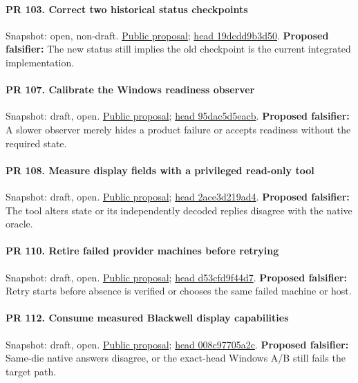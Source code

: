\paragraph{PR 103. Correct two historical status checkpoints}
\readcode Snapshot: open, non-draft.
\href{\repobase/pull/103}{Public proposal};
\href{\repobase/commit/19dcdd9b3d50d6453a933921f96f60667002d7f3}{head 19dcdd9b3d50}.
\textbf{Proposed falsifier:} The new status still implies the old checkpoint is the current
  integrated implementation.

\paragraph{PR 107. Calibrate the Windows readiness observer}
\readcode Snapshot: draft, open.
\href{\repobase/pull/107}{Public proposal};
\href{\repobase/commit/95dac5d5eacb3d2f7b9b8763c4f9df556056599f}{head 95dac5d5eacb}.
\textbf{Proposed falsifier:} A slower observer merely hides a product failure or accepts readiness
  without the required state.

\paragraph{PR 108. Measure display fields with a privileged read-only tool}
\readcode Snapshot: draft, open.
\href{\repobase/pull/108}{Public proposal};
\href{\repobase/commit/2ace3d219ad4490af41c5eccff5b48ea7009a228}{head 2ace3d219ad4}.
\textbf{Proposed falsifier:} The tool alters state or its independently decoded replies disagree
  with the native oracle.

\paragraph{PR 110. Retire failed provider machines before retrying}
\readcode Snapshot: draft, open.
\href{\repobase/pull/110}{Public proposal};
\href{\repobase/commit/d53cfd9f44d7bdbc87887c2e19fb3431545d84b5}{head d53cfd9f44d7}.
\textbf{Proposed falsifier:} Retry starts before absence is verified or chooses the same failed
  machine or host.

\paragraph{PR 112. Consume measured Blackwell display capabilities}
\readcode Snapshot: draft, open.
\href{\repobase/pull/112}{Public proposal};
\href{\repobase/commit/008c97705a2c1cd043f407dc1b5c9e8eb446ad1f}{head 008c97705a2c}.
\textbf{Proposed falsifier:} Same-die native answers disagree, or the exact-head Windows A/B still
  fails the target path.

